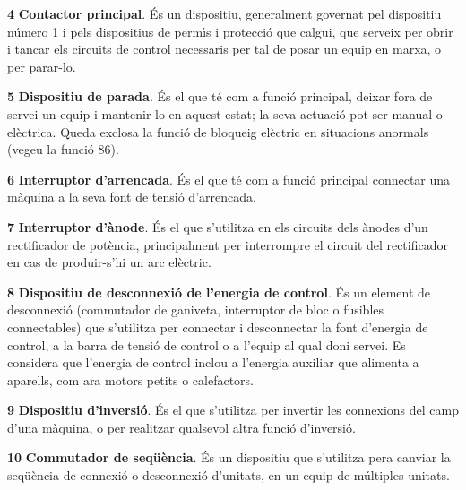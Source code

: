 \begin{multicols}{2}
\begin{list}{}
\item[\textbf{4}]  \textbf{Contactor principal}. \'{E}s un dispositiu,
generalment governat pel dispositiu n\'{u}mero 1 i pels dispositius de perm\'{\i}s i protecci\'{o}
que calgui, que serveix per obrir i tancar els circuits de control necessaris per tal de
posar un equip en marxa, o per parar-lo.

\item[\textbf{5}]   \textbf{Dispositiu de parada}. \'{E}s el que
t\'{e} com a funci\'{o} principal, deixar fora de servei un equip i
mantenir-lo en aquest estat; la seva actuaci\'{o} pot ser manual o
el\`{e}ctrica. Queda exclosa la funci\'{o} de bloqueig el\`{e}ctric en
situacions anormals (vegeu la funci\'{o} 86).

\item[\textbf{6}]  \textbf{Interruptor d'arrencada}. \'{E}s
el que t\'{e} com a funci\'{o} principal connectar una m\`{a}quina a la seva font de tensi\'{o} d'arrencada.

\item[\textbf{7}]  \textbf{Interruptor d'\`{a}node}. \'{E}s el que
s'utilitza en els circuits dels \`{a}nodes d'un rectificador de
pot\`{e}ncia, principalment per interrompre el circuit del rectificador
en  cas de produir-s'hi un arc el\`{e}ctric.

\item[\textbf{8}]  \textbf{Dispositiu de desconnexi\'{o} de l'energia
de control}. \'{E}s un element de desconnexi\'{o} (commutador de ganiveta,
interruptor de bloc o fusibles connectables) que s'utilitza per
connectar i desconnectar la font d'energia de control,  a la barra
de tensi\'{o} de control o a l'equip al qual doni servei. Es considera
que l'energia de control inclou a l'energia auxiliar que alimenta a
aparells, com ara motors petits o calefactors.

\item[\textbf{9}]  \textbf{Dispositiu d'inversi\'{o}}. \'{E}s el
que s'utilitza per invertir les connexions del camp d'una m\`{a}quina, o
per realitzar qualsevol altra funci\'{o}  d'inversi\'{o}.

\item[\textbf{10}]  \textbf{Commutador de seq\"{u}\`{e}ncia}. \'{E}s un
dispositiu que s'utilitza pera canviar la seq\"{u}\`{e}ncia de connexi\'{o} o
desconnexi\'{o} d'unitats, en un equip de m\'{u}ltiples unitats.


\end{list}
\end{multicols}
